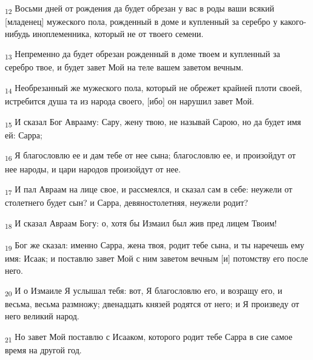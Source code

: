 \begin{tcolorbox}
\textsubscript{12} Восьми дней от рождения да будет обрезан у вас в роды ваши всякий [младенец] мужеского пола, рожденный в доме и купленный за серебро у какого-нибудь иноплеменника, который не от твоего семени.
\end{tcolorbox}
\begin{tcolorbox}
\textsubscript{13} Непременно да будет обрезан рожденный в доме твоем и купленный за серебро твое, и будет завет Мой на теле вашем заветом вечным.
\end{tcolorbox}
\begin{tcolorbox}
\textsubscript{14} Необрезанный же мужеского пола, который не обрежет крайней плоти своей, истребится душа та из народа своего, [ибо] он нарушил завет Мой.
\end{tcolorbox}
\begin{tcolorbox}
\textsubscript{15} И сказал Бог Аврааму: Сару, жену твою, не называй Сарою, но да будет имя ей: Сарра;
\end{tcolorbox}
\begin{tcolorbox}
\textsubscript{16} Я благословлю ее и дам тебе от нее сына; благословлю ее, и произойдут от нее народы, и цари народов произойдут от нее.
\end{tcolorbox}
\begin{tcolorbox}
\textsubscript{17} И пал Авраам на лице свое, и рассмеялся, и сказал сам в себе: неужели от столетнего будет сын? и Сарра, девяностолетняя, неужели родит?
\end{tcolorbox}
\begin{tcolorbox}
\textsubscript{18} И сказал Авраам Богу: о, хотя бы Измаил был жив пред лицем Твоим!
\end{tcolorbox}
\begin{tcolorbox}
\textsubscript{19} Бог же сказал: именно Сарра, жена твоя, родит тебе сына, и ты наречешь ему имя: Исаак; и поставлю завет Мой с ним заветом вечным [и] потомству его после него.
\end{tcolorbox}
\begin{tcolorbox}
\textsubscript{20} И о Измаиле Я услышал тебя: вот, Я благословлю его, и возращу его, и весьма, весьма размножу; двенадцать князей родятся от него; и Я произведу от него великий народ.
\end{tcolorbox}
\begin{tcolorbox}
\textsubscript{21} Но завет Мой поставлю с Исааком, которого родит тебе Сарра в сие самое время на другой год.
\end{tcolorbox}
